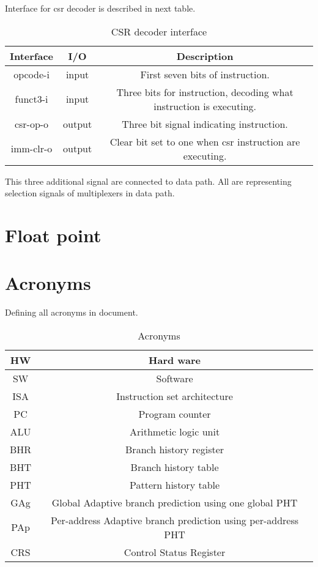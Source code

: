\documentclass{scrreprt}
\begin{document}
\newline
Interface for csr decoder is described in next table. 
\begin{table}[htb!]
            \centering
            \begin{tabular}{|c|c|c|} \hline 
             Interface & I/O & Description \\ \hline  
             opcode-i & input & First seven bits of instruction.  \\ \hline
             funct3-i& input & Three bits for instruction, decoding what instruction is executing.  \\ \hline
             csr-op-o & output & Three bit signal indicating instruction.  \\ \hline
             imm-clr-o & output & Clear bit set to one when csr instruction are executing.  \\ \hline
        \end{tabular}
        \caption{CSR decoder interface}
        \label{tab:csrDI}
\end{table}
\newline
This three additional signal are connected to data path. All are representing selection signals of multiplexers in data path. 

\newpage
{} 
\section*{Float point}

\newpage
{} 
\section*{Acronyms}
    Defining all acronyms in document. 
    \begin{table}[ht]
        \centering
        \begin{tabular}{|c|c|} \hline 
            HW & Hard ware\\ \hline 
            SW & Software\\ \hline 
            ISA & Instruction set architecture\\ \hline 
            PC & Program counter\\ \hline 
            ALU & Arithmetic logic unit\\ \hline 
            BHR & Branch history register\\ \hline
            BHT & Branch history table\\ \hline
            PHT & Pattern history table\\ \hline
            GAg & Global Adaptive branch prediction using one global PHT\\ \hline
            PAp & Per-address Adaptive branch prediction using per-address PHT\\ \hline
            CRS & Control Status Register \\ \hline
        \end{tabular}
        \caption{Acronyms}
        \label{tab:table4}
    \end{table}
\end{document}
